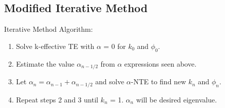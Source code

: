 \documentclass{article}
\begin{document}
\subsection*{Modified Iterative Method}

Iterative Method Algorithm:

\begin{enumerate}

\item Solve k-effective TE with $\alpha$ = 0 for $k_0$ and $\phi_0$.
\item Estimate the value $\alpha_{n-1/2}$ from $\alpha$ expressions seen above.
\item Let $\alpha_n = \alpha_{n-1} + \alpha_{n-1/2}$ and solve $\alpha$-NTE to find new $k_n$ and $\phi_n$.
\item Repeat steps 2 and 3 until $k_n$ = 1. $\alpha_n$ will be desired eigenvalue.

\end{enumerate}
\end{document}
